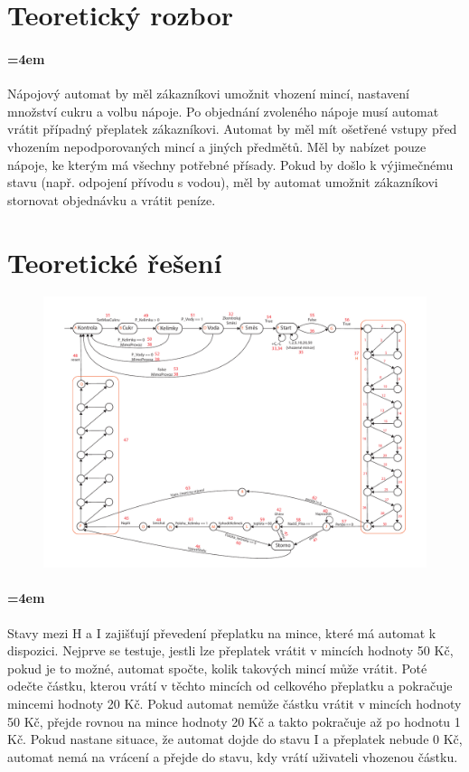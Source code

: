 \documentclass[12pt,a4paper]{article}
\begin{document}
\section{Teoretický rozbor}

\paragraph{\parindent=4em}{	
	Nápojový automat by měl zákazníkovi umožnit vhození mincí, nastavení množství cukru a volbu nápoje. Po objednání zvoleného nápoje musí automat vrátit případný přeplatek zákazníkovi. Automat by měl mít ošetřené vstupy před vhozením nepodporovaných mincí a jiných předmětů. Měl by nabízet pouze nápoje, ke kterým má všechny potřebné přísady. Pokud by došlo k výjimečnému stavu (např. odpojení přívodu s vodou), měl by automat umožnit zákazníkovi stornovat objednávku a vrátit peníze.
}

\newpage
\section{Teoretické řešení}

\begin{figure}[H]	
	\centering
	\includegraphics[angle=-90,width=\textwidth]{doc/kavovar_KA.pdf}
\end{figure}
	
\paragraph{\parindent=4em}{	
	Stavy mezi H a I zajišťují převedení přeplatku na mince, které má automat k dispozici. Nejprve se testuje, jestli lze přeplatek vrátit v mincích hodnoty 50 Kč, pokud je to možné, automat spočte, kolik takových mincí může vrátit. Poté odečte částku, kterou vrátí v těchto mincích od celkového přeplatku a pokračuje mincemi hodnoty 20 Kč. Pokud automat nemůže částku vrátit v mincích hodnoty 50 Kč, přejde rovnou na mince hodnoty 20 Kč a takto pokračuje až po hodnotu 1 Kč. Pokud nastane situace, že automat dojde do stavu I a přeplatek nebude 0 Kč, automat nemá na vrácení a přejde do stavu, kdy vrátí uživateli vhozenou částku.
}	
\end{document}

